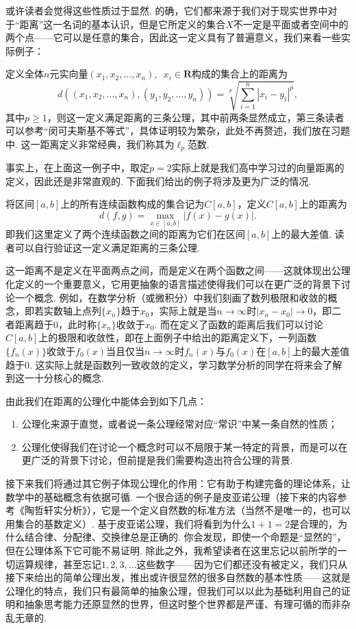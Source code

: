 或许读者会觉得这些性质过于显然. 的确，它们都来源于我们对于现实世界中对于``距离''这一名词的基本认识，但是它所定义的集合$X$不一定是平面或者空间中的两个点——它可以是任意的集合，因此这一定义具有了普遍意义，我们来看一些实际例子：

\begin{example}
    定义全体$n$元实向量$(x_1,x_2,\ldots,x_n),\enspace x_i\in \mathbf{R}$构成的集合上的距离为
    \[d((x_1,x_2,\ldots,x_n),(y_1,y_2,\ldots,y_n))=\sqrt[p]{\sum_{i=1}^n|x_i-y_i|^p},\]
    其中$p \geqslant 1$，则这一定义满足距离的三条公理，其中前两条显然成立，第三条读者可以参考``闵可夫斯基不等式''，具体证明较为繁杂，此处不再赘述，我们放在习题中. 这一距离定义非常经典，我们称其为$\ell_p$范数.
\end{example}

事实上，在上面这一例子中，取定$p=2$实际上就是我们高中学习过的向量距离的定义，因此还是非常直观的. 下面我们给出的例子将涉及更为广泛的情况.

\begin{example}
    将区间$[a,b]$上的所有连续函数构成的集合记为$C[a,b]$，定义$C[a,b]$上的距离为
    \[d(f,g)=\max_{x\in [a,b]}|f(x)-g(x)|.\]
    即我们这里定义了两个连续函数之间的距离为它们在区间$[a,b]$上的最大差值. 读者可以自行验证这一定义满足距离的三条公理.
\end{example}

这一距离不是定义在平面两点之间，而是定义在两个函数之间——这就体现出公理化定义的一个重要意义，它用更抽象的语言描述使得我们可以在更广泛的背景下讨论一个概念. 例如，在数学分析（或微积分）中我们刻画了数列极限和收敛的概念，即若实数轴上点列$\{x_n\}$趋于$x_0$，实际上就是当$n\to\infty$时$|x_n-x_0|\to 0$，即二者距离趋于0，此时称$\{x_n\}$收敛于$x_0$. 而在定义了函数的距离后我们可以讨论$C[a,b]$上的极限和收敛性，即在上面例子中给出的距离定义下，一列函数$\{f_n(x)\}$收敛于$f_0(x)$当且仅当$n\to\infty$时$f_n(x)$与$f_0(x)$在$[a,b]$上的最大差值趋于0. 这实际上就是函数列一致收敛的定义，学习数学分析的同学在将来会了解到这一十分核心的概念.

由此我们在距离的公理化中能体会到如下几点：
\begin{enumerate}
    \item 公理化来源于直觉，或者说一条公理经常对应``常识''中某一条自然的性质；

    \item 公理化使得我们在讨论一个概念时可以不局限于某一特定的背景，而是可以在更广泛的背景下讨论，但前提是我们需要构造出符合公理的背景.
\end{enumerate}

接下来我们将通过其它例子体现公理化的作用：它有助于构建完备的理论体系，让数学中的基础概念有依据可循. 一个很合适的例子是皮亚诺公理（接下来的内容参考《陶哲轩实分析》），它是一个定义自然数的标准方法（当然不是唯一的，也可以用集合的基数定义）. 基于皮亚诺公理，我们将看到为什么$1+1=2$是合理的，为什么结合律、分配律、交换律总是正确的. 你会发现，即使一个命题是``显然的''，但在公理体系下它可能不易证明. 除此之外，我希望读者在这里忘记以前所学的一切运算规律，甚至忘记$1,2,3,\ldots$这些数字——因为它们都还没有被定义，我们只从接下来给出的简单公理出发，推出或许很显然的很多自然数的基本性质——这就是公理化的特点，我们只有最简单的抽象公理，但我们可以以此为基础利用自己的证明和抽象思考能力还原显然的世界，但这时整个世界都是严谨、有理可循的而非杂乱无章的.

